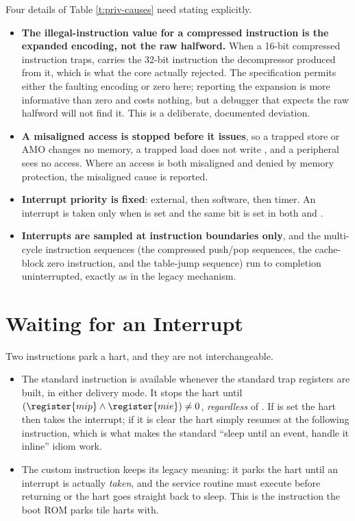 Four details of Table \ref{t:priv-causes} need stating explicitly.

\begin{itemize}
	\item \textbf{The illegal-instruction value for a compressed instruction is the expanded encoding, not the raw halfword.} When a 16-bit compressed instruction traps,  carries the 32-bit instruction the decompressor produced from it, which is what the core actually rejected. The specification permits either the faulting encoding or zero here; reporting the expansion is more informative than zero and costs nothing, but a debugger that expects the raw halfword will not find it. This is a deliberate, documented deviation.
	\item \textbf{A misaligned access is stopped before it issues}, so a trapped store or AMO changes no memory, a trapped load does not write , and a peripheral sees no access. Where an access is both misaligned and denied by memory protection, the misaligned cause is reported.
	\item \textbf{Interrupt priority is fixed}: external, then software, then timer. An interrupt is taken only when  is set and the same bit is set in both  and .
	\item \textbf{Interrupts are sampled at instruction boundaries only}, and the multi-cycle instruction sequences (the compressed push/pop sequences, the cache-block zero instruction, and the table-jump sequence) run to completion uninterrupted, exactly as in the legacy mechanism.
\end{itemize}

\section{Waiting for an Interrupt} \label{ss:priv-wfi}

Two instructions park a hart, and they are not interchangeable.

\begin{itemize}
	\item The standard  instruction is available whenever the standard trap registers are built, in either delivery mode. It stops the hart until $(\register{mip} \wedge \register{mie}) \neq 0$, \textit{regardless} of . If  is set the hart then takes the interrupt; if it is clear the hart simply resumes at the following instruction, which is what makes the standard ``sleep until an event, handle it inline'' idiom work.
	\item The custom  instruction keeps its legacy meaning: it parks the hart until an interrupt is actually \textit{taken}, and the service routine must execute  before returning or the hart goes straight back to sleep. This is the instruction the boot ROM parks tile harts with.
\end{itemize}

